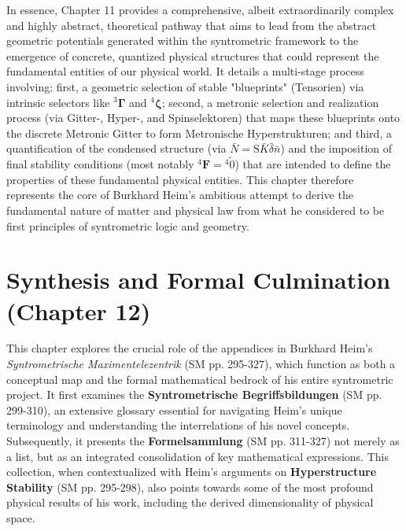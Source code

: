 \documentclass[12pt]{article}
\newcommand{\fundamentalkondensor}{{}^3\bm{\Gamma}}
\newcommand{\strukturkompressor}{{}^4\bm{\zeta}}
\newcommand{\metronisiertekondensor}[1]{{}^{#1}\mathbf{F}}
\begin{document}
In essence, Chapter 11 provides a comprehensive, albeit extraordinarily complex and highly abstract, theoretical pathway that aims to lead from the abstract geometric potentials generated within the syntrometric framework to the emergence of concrete, quantized physical structures that could represent the fundamental entities of our physical world. It details a multi-stage process involving: first, a geometric selection of stable "blueprints" (Tensorien) via intrinsic selectors like \( \fundamentalkondensor \) and \( \strukturkompressor \); second, a metronic selection and realization process (via Gitter-, Hyper-, and Spinselektoren) that maps these blueprints onto the discrete Metronic Gitter to form Metronische Hyperstrukturen; and third, a quantification of the condensed structure (via \(\bar{N} = \mathrm{S}\bar{K}\bar{\delta}\bar{n}\)) and the imposition of final stability conditions (most notably \( \metronisiertekondensor{4}={}^{4}\tilde{0} \)) that are intended to define the properties of these fundamental physical entities. This chapter therefore represents the core of Burkhard Heim's ambitious attempt to derive the fundamental nature of matter and physical law from what he considered to be first principles of syntrometric logic and geometry.

\clearpage 

\section{Synthesis and Formal Culmination (Chapter 12)} \label{sec:appendix}

This chapter explores the crucial role of the appendices in Burkhard Heim's \textit{Syntrometrische Maximentelezentrik} (SM pp. 295-327), which function as both a conceptual map and the formal mathematical bedrock of his entire syntrometric project. It first examines the \textbf{Syntrometrische Begriffsbildungen} (SM pp. 299-310), an extensive glossary essential for navigating Heim's unique terminology and understanding the interrelations of his novel concepts. Subsequently, it presents the \textbf{Formelsammlung} (SM pp. 311-327) not merely as a list, but as an integrated consolidation of key mathematical expressions. This collection, when contextualized with Heim's arguments on \textbf{Hyperstructure Stability} (SM pp. 295-298), also points towards some of the most profound physical results of his work, including the derived dimensionality of physical space.
\end{document}
